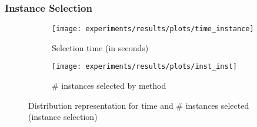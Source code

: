 \documentclass[preprint,12pt]{elsarticle}
\begin{document}
\subsubsection{Instance Selection}


\begin{figure}
\begin{subfigure}{.5\textwidth}
  \centering
  \texttt{[image: experiments/results/plots/time\_instance]}
  \caption{Selection time (in seconds)}
  \label{fig:sfig1}
\end{subfigure}%
\begin{subfigure}{.5\textwidth}
  \centering
  \texttt{[image: experiments/results/plots/inst\_inst]}
  \caption{\# instances selected by method}
  \label{fig:sfig2}
\end{subfigure}
\caption{Distribution representation for time and \# instances selected (instance selection)}
\label{fig:fig}
\end{figure}
\end{document}

